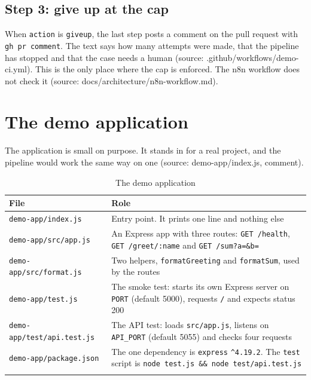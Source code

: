 \subsection{Step 3: give up at the cap}

When \texttt{action} is \texttt{giveup}, the last step posts a comment on the pull request with \texttt{gh pr comment}. The text says how many attempts were made, that the pipeline has stopped and that the case needs a human (source: .github/\allowbreak{}workflows/\allowbreak{}demo-ci.yml). This is the only place where the cap is enforced. The n8n workflow does not check it (source: docs/\allowbreak{}architecture/\allowbreak{}n8n-workflow.md).

\section{The demo application}

The application is small on purpose. It stands in for a real project, and the pipeline would work the same way on one (source: demo-app/\allowbreak{}index.js, comment).

\begingroup\small
\begin{longtable}{>{\raggedright\arraybackslash}p{0.510\dimexpr\linewidth-4\tabcolsep\relax}>{\raggedright\arraybackslash}p{0.490\dimexpr\linewidth-4\tabcolsep\relax}}
\toprule
\rowcolor{gray!14}\textbf{File} & \textbf{Role} \\
\midrule
\endhead
\bottomrule
\endfoot
\endlastfoot
\texttt{demo-\allowbreak{}app/\allowbreak{}index.\allowbreak{}js} & Entry point. It prints one line and nothing else \\
\texttt{demo-\allowbreak{}app/\allowbreak{}src/\allowbreak{}app.\allowbreak{}js} & An Express app with three routes: \texttt{GET /\allowbreak{}health}, \texttt{GET /\allowbreak{}greet/\allowbreak{}:\allowbreak{}name} and \texttt{GET /\allowbreak{}sum?a=\&b=} \\
\texttt{demo-\allowbreak{}app/\allowbreak{}src/\allowbreak{}format.\allowbreak{}js} & Two helpers, \texttt{formatGreeting} and \texttt{formatSum}, used by the routes \\
\texttt{demo-\allowbreak{}app/\allowbreak{}test.\allowbreak{}js} & The smoke test: starts its own Express server on \texttt{PORT} (default 5000), requests \texttt{/\allowbreak{}} and expects status 200 \\
\texttt{demo-\allowbreak{}app/\allowbreak{}test/\allowbreak{}api.\allowbreak{}test.\allowbreak{}js} & The API test: loads \texttt{src/\allowbreak{}app.\allowbreak{}js}, listens on \texttt{API\_\allowbreak{}PORT} (default 5055) and checks four requests \\
\texttt{demo-\allowbreak{}app/\allowbreak{}package.\allowbreak{}json} & The one dependency is \texttt{express} \texttt{\textasciicircum{}4.\allowbreak{}19.\allowbreak{}2}. The \texttt{test} script is \texttt{node test.\allowbreak{}js \&\& node test/\allowbreak{}api.\allowbreak{}test.\allowbreak{}js} \\
\bottomrule
\caption{The demo application}\label{tab:05-2}\\
\end{longtable}
\endgroup

